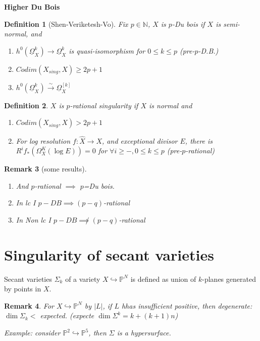 \documentclass{article}
\newtheorem{definition}{Definition}[section]
\newtheorem{remark}[definition]{Remark}
\begin{document}
\textbf{Higher Du Bois}
\begin{definition}[Shen-Veriketesh-Vo]
  Fix $ p\in \mathbb{N} $, $X$ is $p$-Du bois if $X$ is semi-normal, and
  \begin{enumerate}
    \item $ h^{0}(\underline{\Omega}_{X}^{k})\to \underline{\Omega}_{X}^{k} $ is quasi-isomorphism for $ 0\leq k\leq p $ (pre-$ p $-D.B.)
    \item $ Codim (X_{sing},X)\geq 2p+1 $
    \item $  h^{0}(\underline{\Omega}_{X}^{k})\xrightarrow{\sim} \underline{\Omega}_{X}^{[k]} $
  \end{enumerate}
\end{definition}
\begin{definition}
  $X$ is $p$-rational singularity if $X$ is normal and
  \begin{enumerate}
    \item $ Codim (X_{sing},X)> 2p+1 $
    \item For log resolution $ f:\hat{X}\to X $, and exceptional divisor $E$, there is  $ R^{i}f_{*}(\Omega_{X}^{K}(\log E))=0 $ for $ \forall i\geq -, 0\leq k\leq p $ (pre-$ p $-rational)
  \end{enumerate}
\end{definition}
\begin{remark}[some results]
  \begin{enumerate}
    \item And $ p $-rational $ \implies $ $ p $=Du bois.
      \item In lc I $ p-DB \implies (p-q) $-rational
      \item In Non lc I $ p-DB \not\implies (p-q) $-rational
  \end{enumerate}
  
\end{remark}
\section{Singularity of secant varieties}
Secant varieties $ \Sigma_{k} $ of a variety $X \hookrightarrow \mathbb{P}^{N}$ is defined as  union of $k$-planes generated by points in $X$.

\begin{remark}
  For $ X \hookrightarrow \mathbb{P}^{N} $ by $ |L| $, if $L$ hhas insufficient positive, then degenerate: $ \dim \Sigma_{k} < $ expected. (expecte $ \dim \Sigma^{k}=k+(k+1)n $)

  Example: consider $ \mathbb{P}^{2}\hookrightarrow \mathbb{P}^{5} $, then $ \Sigma $ is a hypersurface.
\end{remark}
\end{document}
